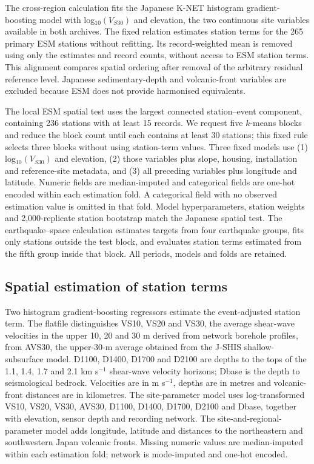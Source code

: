 \documentclass[11pt]{article}
\begin{document}
The cross-region calculation fits the Japanese K-NET histogram gradient-boosting model with log$_{10}(V_{S30})$ and elevation, the two continuous site variables available in both archives. The fixed relation estimates station terms for the 265 primary ESM stations without refitting. Its record-weighted mean is removed using only the estimates and record counts, without access to ESM station terms. This alignment compares spatial ordering after removal of the arbitrary residual reference level. Japanese sedimentary-depth and volcanic-front variables are excluded because ESM does not provide harmonised equivalents.

The local ESM spatial test uses the largest connected station--event component, containing 236 stations with at least 15 records. We request five $k$-means blocks and reduce the block count until each contains at least 30 stations; this fixed rule selects three blocks without using station-term values. Three fixed models use (1) log$_{10}(V_{S30})$ and elevation, (2) those variables plus slope, housing, installation and reference-site metadata, and (3) all preceding variables plus longitude and latitude. Numeric fields are median-imputed and categorical fields are one-hot encoded within each estimation fold. A categorical field with no observed estimation value is omitted in that fold. Model hyperparameters, station weights and 2,000-replicate station bootstrap match the Japanese spatial test. The earthquake--space calculation estimates targets from four earthquake groups, fits only stations outside the test block, and evaluates station terms estimated from the fifth group inside that block. All periods, models and folds are retained.

\subsection{Spatial estimation of station terms}

Two histogram gradient-boosting regressors estimate the event-adjusted station term. The flatfile distinguishes VS10, VS20 and VS30, the average shear-wave velocities in the upper 10, 20 and 30 m derived from network borehole profiles, from AVS30, the upper-30-m average obtained from the J-SHIS shallow-subsurface model. D1100, D1400, D1700 and D2100 are depths to the tops of the 1.1, 1.4, 1.7 and 2.1 km s$^{-1}$ shear-wave velocity horizons; Dbase is the depth to seismological bedrock. Velocities are in m s$^{-1}$, depths are in metres and volcanic-front distances are in kilometres. The site-parameter model uses log-transformed VS10, VS20, VS30, AVS30, D1100, D1400, D1700, D2100 and Dbase, together with elevation, sensor depth and recording network. The site-and-regional-parameter model adds longitude, latitude and distances to the northeastern and southwestern Japan volcanic fronts. Missing numeric values are median-imputed within each estimation fold; network is mode-imputed and one-hot encoded.
\end{document}
